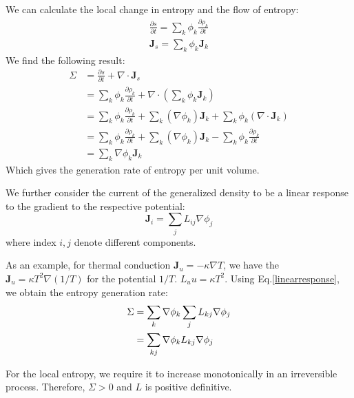 \documentclass{article}
\newcommand{\pfrac}[2]{\frac{\partial #1}{\partial #2}}
\begin{document}
We can calculate the local change in entropy and the flow of entropy:
\begin{gather}
    \pfrac{s}{t} = \sum_k \phi_k \pfrac{\rho_k}{t} \\
    \mathbf{J}_s = \sum_k \phi_k \mathbf{J}_{k}
\end{gather}
We find the following result:
\begin{align}
    \Sigma &= \pfrac{s}{t} +\nabla \cdot  \mathbf{J}_s \\
    & = \sum_k \phi_k \pfrac{\rho_k}{t} + \nabla \cdot \left(\sum_k \phi_k \mathbf{J}_{k} \right)\\
    & = \sum_k \phi_k \pfrac{\rho_k}{t} + \sum_k (\nabla  \phi_k) \mathbf{J}_{k} + \sum_k \phi_k (\nabla \cdot \mathbf{J}_{k}) \\
    & = \sum_k \phi_k \pfrac{\rho_k}{t} + \sum_k (\nabla  \phi_k) \mathbf{J}_{k} - \sum_k \phi_k \pfrac{\rho_k}{t} \\
    & = \sum_k \nabla \phi_k \mathbf{J}_{k}
\end{align}
Which gives the generation rate of entropy per unit volume.

We further consider the current of the generalized density to be a linear response to the 
gradient to the respective potential:
\begin{equation}
    \mathbf{J}_i = \sum_j L_{ij} \nabla \phi_j \label{linearresponse}
\end{equation}
where index $i,j$ denote different components.

As an example, for thermal conduction $\mathbf{J}_u = - \kappa \nabla T$, we have 
the $\mathbf{J}_u = \kappa T^2 \nabla (1/T)$ for the potential $1/T$. $L_uu = \kappa T^2$.
Using Eq.\ref{linearresponse}, we obtain the entropy generation rate:
\begin{align}
    \Sigma &= \sum_k \nabla \phi_k \sum_j L_{kj} \nabla \phi_j \notag \\
        & = \sum_{kj} \nabla \phi_k L_{kj} \nabla \phi_j
\end{align}

For the local entropy, we require it to increase monotonically in an irreversible process. Therefore,
$\Sigma > 0$ and $L$ is positive definitive.
\end{document}
